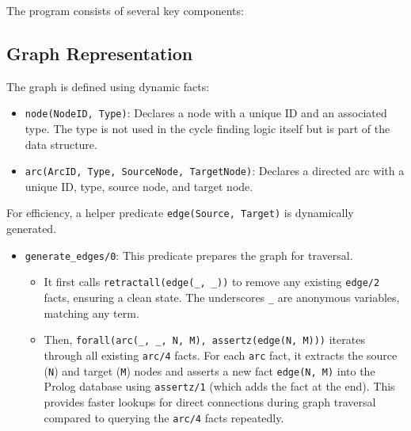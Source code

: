 \documentclass[12pt,a4paper]{article}
\begin{document}
The program consists of several key components:

\subsection{Graph Representation}
The graph is defined using dynamic facts:
\begin{itemize}
    \item \texttt{node(NodeID, Type)}: Declares a node with a unique ID and an associated type. The type is not used in the cycle finding logic itself but is part of the data structure.
    \item \texttt{arc(ArcID, Type, SourceNode, TargetNode)}: Declares a directed arc with a unique ID, type, source node, and target node.
\end{itemize}
For efficiency, a helper predicate \texttt{edge(Source, Target)} is dynamically generated.
\begin{itemize}
    \item \texttt{generate\_edges/0}: This predicate prepares the graph for traversal.
        \begin{itemize}
            \item It first calls \texttt{retractall(edge(\_, \_))} to remove any existing \texttt{edge/2} facts, ensuring a clean state. The underscores \texttt{\_} are anonymous variables, matching any term.
            \item Then, \texttt{forall(arc(\_, \_, N, M), assertz(edge(N, M)))} iterates through all existing \texttt{arc/4} facts. For each \texttt{arc} fact, it extracts the source (\texttt{N}) and target (\texttt{M}) nodes and asserts a new fact \texttt{edge(N, M)} into the Prolog database using \texttt{assertz/1} (which adds the fact at the end). This provides faster lookups for direct connections during graph traversal compared to querying the \texttt{arc/4} facts repeatedly.
        \end{itemize}
\end{itemize}
\end{document}
